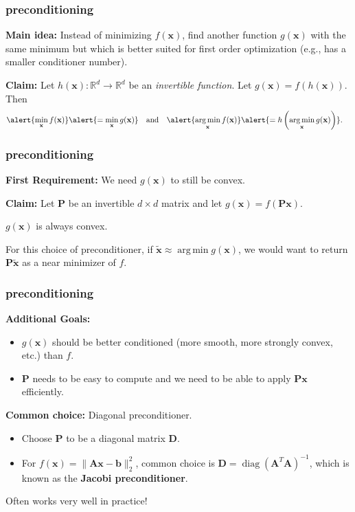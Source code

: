 \documentclass[compress]{beamer}
\newcommand{\bv}[1]{\mathbf{#1}}
\newcommand{\R}{\mathbb{R}}
\DeclareMathOperator*{\argmin}{arg\,min}
\DeclareMathOperator{\diag}{diag}
\begin{document}
\begin{frame}
	\frametitle{preconditioning}
	\textbf{Main idea:}
	Instead of minimizing $f(\bv{x})$, find another function $g(\bv{x})$ with the same minimum but which is better suited for first order optimization (e.g., has a smaller conditioner number).
	
	\vspace{2em}
	\textbf{Claim:} Let $h(\bv{x}): \R^d \rightarrow \R^d$ be an \emph{invertible function}. Let $g(\bv{x}) = f(h(\bv{x}))$. Then
	\begin{align*}
		\alert{\min_{\bv{x}} f(\bv{x})} &\alert{= \min_{\bv{x}} g(\bv{x})} & &\text{and} & \alert{\argmin_{\bv{x}} f(\bv{x})} &\alert{= h\left(\argmin_{\bv{x}} g(\bv{x})\right)}.
	\end{align*}
\end{frame}

\begin{frame}[t]
	\frametitle{preconditioning}
	\textbf{First Requirement:} We need $g(\bv{x})$ to still be convex.
	
	\textbf{Claim:} Let $\bv{P}$ be an invertible $d\times d$ matrix and let $g(\bv{x}) = f(\bv{P}\bv{x})$. 
	\begin{center} 
		\alert{$g(\bv{x})$ is always convex.}
	\end{center}

\vspace{2em}
	For this choice of preconditioner, if $\tilde{\bv{x}} \approx \argmin g(\bv{x})$, we would want to return $\textbf{P}\tilde{\bv{x}}$ as a near minimizer of $f$.
\end{frame}

\begin{frame}[t]
	\frametitle{preconditioning}
	\textbf{Additional Goals:} 
	\begin{itemize}
		\item $g(\bv{x})$ should be better conditioned (more smooth, more strongly convex, etc.) than $f$. 
		\item $\bv{P}$ needs to be easy to compute and we need to be able to apply $\bv{P}\bv{x}$ efficiently.
	\end{itemize}

	\textbf{Common choice:} Diagonal preconditioner. 
	\begin{itemize}
		\item Choose $\bv{P}$ to be a diagonal matrix $\bv{D}$. 
		\item For $f(\bv{x}) = \|\bv{A}\bv{x} - \bv{b}\|_2^2$, common choice is $\bv{D} = \diag(\bv{A}^T\bv{A})^{-1}$, which is known as the \textbf{Jacobi preconditioner}.
	\end{itemize}
	Often works very well in practice!
\end{frame}
\end{document}
